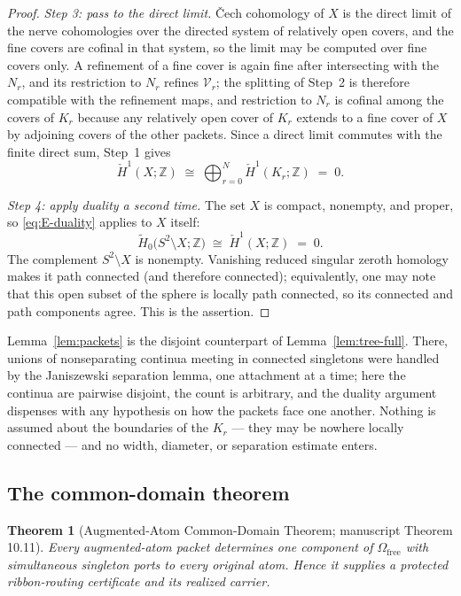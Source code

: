 \documentclass[11pt,reqno]{amsart}
\newtheorem{theorem}{Theorem}[section]
\theoremstyle{definition}
\theoremstyle{remark}
\newcommand{\Z}{\mathbb Z}
\newcommand{\Omfree}{\Omega_{\mathrm{free}}}
\begin{document}
\begin{proof}
\emph{Step 3: pass to the direct limit.}
\v{C}ech cohomology of $X$ is the direct limit of the nerve cohomologies over the
directed system of relatively open covers, and the fine covers are cofinal in that
system, so the limit may be computed over fine covers only. A refinement of a fine
cover is again fine after intersecting with the $N_r$, and its restriction to $N_r$
refines $\mathcal V_r$; the splitting of Step~2 is therefore compatible with the
refinement maps, and restriction to $N_r$ is cofinal among the covers of $K_r$
because any relatively open cover of $K_r$ extends to a fine cover of $X$ by
adjoining covers of the other packets. Since a direct limit commutes with the finite
direct sum, Step~1 gives
\[
\check H^1(X;\Z)\;\cong\;\bigoplus_{r=0}^{N}\check H^1(K_r;\Z)\;=\;0 .
\]

\emph{Step 4: apply duality a second time.}
The set $X$ is compact, nonempty, and proper, so \eqref{eq:E-duality} applies to $X$
itself:
\[
\widetilde H_0\bigl(S^2\setminus X;\Z\bigr)\;\cong\;\check H^1(X;\Z)\;=\;0 .
\]
The complement $S^2\setminus X$ is nonempty.  Vanishing reduced singular
zeroth homology makes it path connected (and therefore connected); equivalently,
one may note that this open subset of the sphere is locally path connected, so
its connected and path components agree.  This is the assertion.
\end{proof}

Lemma~\ref{lem:packets} is the disjoint counterpart of
Lemma~\ref{lem:tree-full}. There, unions of nonseparating continua meeting in
connected singletons were handled by the Janiszewski separation lemma, one attachment
at a time; here the continua are pairwise disjoint, the count is arbitrary, and the
duality argument dispenses with any hypothesis on how the packets face one another.
Nothing is assumed about the boundaries of the $K_r$ --- they may be nowhere locally
connected --- and no width, diameter, or separation estimate enters.

\subsection{The common-domain theorem}\label{subsec:E-common}

\begin{theorem}[Augmented-Atom Common-Domain Theorem; manuscript Theorem
10.11]\label{thm:common-domain}
Every augmented-atom packet determines one component of $\Omfree$ with simultaneous
singleton ports to every original atom.  Hence it supplies a protected
ribbon-routing certificate and its realized carrier.
\end{theorem}
\end{document}
